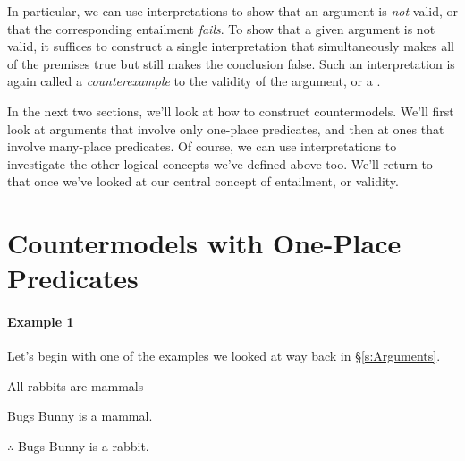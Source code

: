 In particular, we can use interpretations to show that an argument is \emph{not} valid, or that the corresponding entailment \emph{fails}.  To show that a given argument is not valid, it suffices to construct a single interpretation that simultaneously makes all of the premises true but still makes the conclusion false.  Such an interpretation is again called a \emph{counterexample} to the validity of the argument, or a .


In the next two sections, we'll look at how to construct countermodels.  We'll first look at arguments that involve only one-place predicates, and then at ones that involve many-place predicates.  Of course, we can use interpretations to investigate the other logical concepts we've defined above too.  We'll return to that once we've looked at our central concept of entailment, or validity.

\section{Countermodels with One-Place Predicates}\label{s:CountermodelOnePl}

\paragraph{Example 1} Let's begin with one of the examples we looked at way back in \S\ref{s:Arguments}.

\begin{earg}
\item[\ex{exarg4}]All rabbits are mammals
\item[] Bugs Bunny is a mammal.
\item[] $\therefore$ Bugs Bunny is a rabbit.
\end{earg}

